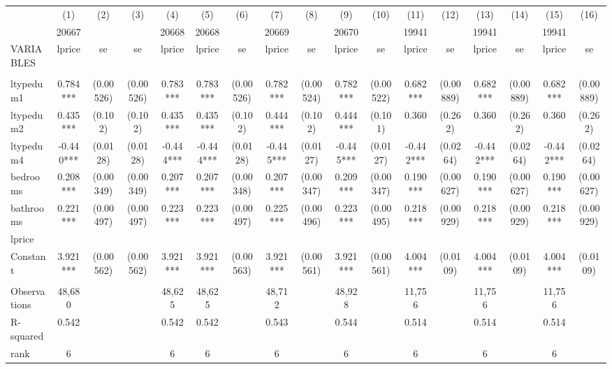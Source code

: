 \documentclass[]{article}
\begin{document}
\begin{tabular}{lcccccccccccccccc} \hline
 & (1) & (2) & (3) & (4) & (5) & (6) & (7) & (8) & (9) & (10) & (11) & (12) & (13) & (14) & (15) & (16) \\
 & 20667 &  &  & 20668 & 20668 &  & 20669 &  & 20670 &  & 19941 &  & 19941 &  & 19941 &  \\
VARIABLES & lprice & se & se & lprice & lprice & se & lprice & se & lprice & se & lprice & se & lprice & se & lprice & se \\ \hline
 &  &  &  &  &  &  &  &  &  &  &  &  &  &  &  &  \\
ltypedum1 & 0.784*** & (0.00526) & (0.00526) & 0.783*** & 0.783*** & (0.00526) & 0.782*** & (0.00524) & 0.782*** & (0.00522) & 0.682*** & (0.00889) & 0.682*** & (0.00889) & 0.682*** & (0.00889) \\
ltypedum2 & 0.435*** & (0.102) & (0.102) & 0.435*** & 0.435*** & (0.102) & 0.444*** & (0.102) & 0.444*** & (0.101) & 0.360 & (0.262) & 0.360 & (0.262) & 0.360 & (0.262) \\
ltypedum4 & -0.440*** & (0.0128) & (0.0128) & -0.444*** & -0.444*** & (0.0128) & -0.445*** & (0.0127) & -0.445*** & (0.0127) & -0.442*** & (0.0264) & -0.442*** & (0.0264) & -0.442*** & (0.0264) \\
bedrooms & 0.208*** & (0.00349) & (0.00349) & 0.207*** & 0.207*** & (0.00348) & 0.207*** & (0.00347) & 0.209*** & (0.00347) & 0.190*** & (0.00627) & 0.190*** & (0.00627) & 0.190*** & (0.00627) \\
bathrooms & 0.221*** & (0.00497) & (0.00497) & 0.223*** & 0.223*** & (0.00497) & 0.225*** & (0.00496) & 0.223*** & (0.00495) & 0.218*** & (0.00929) & 0.218*** & (0.00929) & 0.218*** & (0.00929) \\
lprice &  &  &  &  &  &  &  &  &  &  &  &  &  &  &  &  \\
Constant & 3.921*** & (0.00562) & (0.00562) & 3.921*** & 3.921*** & (0.00563) & 3.921*** & (0.00561) & 3.921*** & (0.00561) & 4.004*** & (0.0109) & 4.004*** & (0.0109) & 4.004*** & (0.0109) \\
 &  &  &  &  &  &  &  &  &  &  &  &  &  &  &  &  \\
Observations & 48,680 &  &  & 48,625 & 48,625 &  & 48,712 &  & 48,928 &  & 11,756 &  & 11,756 &  & 11,756 &  \\
R-squared & 0.542 &  &  & 0.542 & 0.542 &  & 0.543 &  & 0.544 &  & 0.514 &  & 0.514 &  & 0.514 &  \\
rank & 6 &  &  & 6 & 6 &  & 6 &  & 6 &  & 6 &  & 6 &  & 6 &  \\

\end{tabular}
\end{document}

